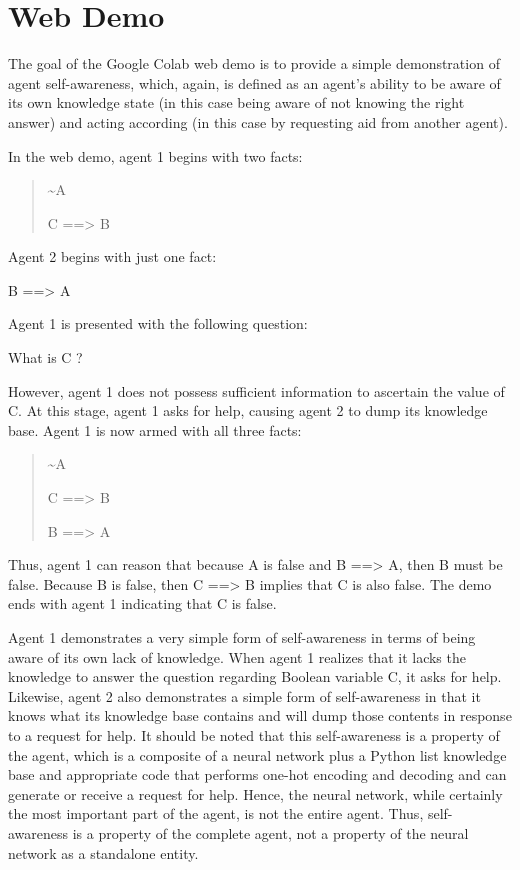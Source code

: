 \documentclass[
]{article}
\begin{document}
\hypertarget{web-demo}{%
\section{Web Demo}\label{web-demo}}

The goal of the Google Colab web demo is to provide a simple
demonstration of agent self-awareness, which, again, is defined as an
agent's ability to be aware of its own knowledge state (in this case
being aware of not knowing the right answer) and acting according (in
this case by requesting aid from another agent).

In the web demo, agent 1 begins with two facts:

\begin{quote}
\textasciitilde A

C ==\textgreater{} B
\end{quote}

Agent 2 begins with just one fact:

B ==\textgreater{} A

Agent 1 is presented with the following question:

What is C ?

However, agent 1 does not possess sufficient information to ascertain
the value of C. At this stage, agent 1 asks for help, causing agent 2 to
dump its knowledge base. Agent 1 is now armed with all three facts:

\begin{quote}
\textasciitilde A

C ==\textgreater{} B

B ==\textgreater{} A
\end{quote}

Thus, agent 1 can reason that because A is false and B ==\textgreater{}
A, then B must be false. Because B is false, then C ==\textgreater{} B
implies that C is also false. The demo ends with agent 1 indicating that
C is false.

Agent 1 demonstrates a very simple form of self-awareness in terms of
being aware of its own lack of knowledge. When agent 1 realizes that it
lacks the knowledge to answer the question regarding Boolean variable C,
it asks for help. Likewise, agent 2 also demonstrates a simple form of
self-awareness in that it knows what its knowledge base contains and
will dump those contents in response to a request for help. It should be
noted that this self-awareness is a property of the agent, which is a
composite of a neural network plus a Python list knowledge base and
appropriate code that performs one-hot encoding and decoding and can
generate or receive a request for help. Hence, the neural network, while
certainly the most important part of the agent, is not the entire agent.
Thus, self-awareness is a property of the complete agent, not a property
of the neural network as a standalone entity.
\end{document}
